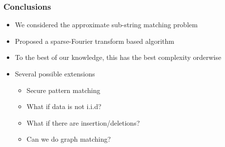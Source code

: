 \documentclass[10pt,xcolor=table]{beamer}
\begin{document}
\begin{frame}\frametitle{Conclusions}
\begin{itemize}
\item We considered the approximate sub-string matching problem
\item Proposed a sparse-Fourier transform based algorithm
\item To the best of our knowledge, this has the best complexity orderwise
\item Several possible extensions
    \begin{itemize}
    \item Secure pattern matching
    \item What if data is not i.i.d?
    \item What if there are insertion/deletions?
    \item Can we do graph matching?
    \end{itemize}
\end{itemize}
\end{frame}
\end{document}
